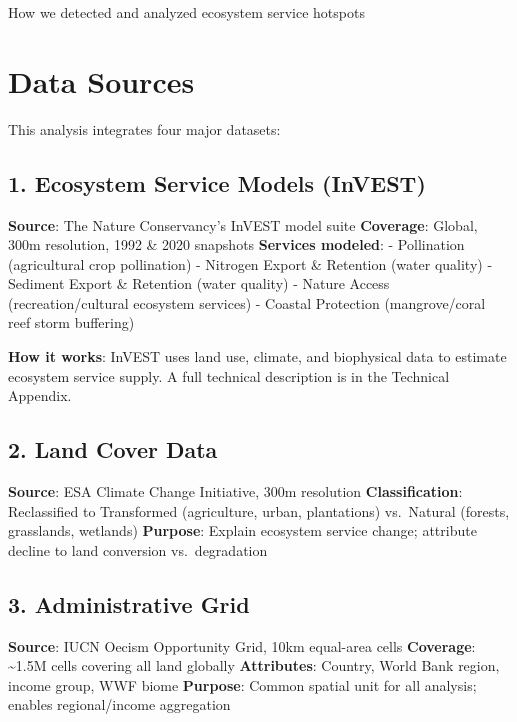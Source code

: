 \documentclass[
  letterpaper,
  DIV=11,
  numbers=noendperiod]{scrreprt}
\begin{document}
How we detected and analyzed ecosystem service hotspots

\hfill\break

\section{Data Sources}\label{data-sources}

This analysis integrates four major datasets:

\subsection{1. Ecosystem Service Models
(InVEST)}\label{ecosystem-service-models-invest}

\textbf{Source}: The Nature Conservancy's InVEST model suite
\textbf{Coverage}: Global, 300m resolution, 1992 \& 2020 snapshots
\textbf{Services modeled}: - Pollination (agricultural crop pollination)
- Nitrogen Export \& Retention (water quality) - Sediment Export \&
Retention (water quality) - Nature Access (recreation/cultural ecosystem
services) - Coastal Protection (mangrove/coral reef storm buffering)

\textbf{How it works}: InVEST uses land use, climate, and biophysical
data to estimate ecosystem service supply. A full technical description
is in the Technical Appendix.

\subsection{2. Land Cover Data}\label{land-cover-data}

\textbf{Source}: ESA Climate Change Initiative, 300m resolution
\textbf{Classification}: Reclassified to Transformed (agriculture,
urban, plantations) vs.~Natural (forests, grasslands, wetlands)
\textbf{Purpose}: Explain ecosystem service change; attribute decline to
land conversion vs.~degradation

\subsection{3. Administrative Grid}\label{administrative-grid}

\textbf{Source}: IUCN Oecism Opportunity Grid, 10km equal-area cells
\textbf{Coverage}: \textasciitilde1.5M cells covering all land globally
\textbf{Attributes}: Country, World Bank region, income group, WWF biome
\textbf{Purpose}: Common spatial unit for all analysis; enables
regional/income aggregation
\end{document}
